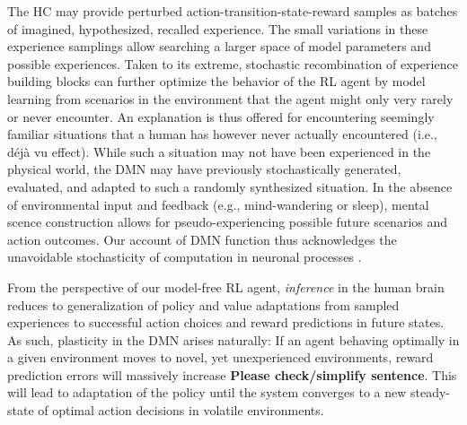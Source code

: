 \documentclass[10pt,letterpaper]{article}
\begin{document}
The HC may provide perturbed action-transition-state-reward samples
  as batches of imagined, hypothesized, recalled experience.
  The small variations in these experience samplings allow searching
  a larger space of model parameters and possible experiences.
  Taken to its extreme, stochastic recombination of experience
  building blocks can further optimize the behavior of the RL agent
  by model learning from scenarios in the environment that the agent might
  only very rarely or never encounter.
  An explanation is thus offered for encountering seemingly familiar situations that
  a human has however never actually encountered (i.e., d\'{e}j\`{a} vu effect).
  While such a situation may not have been experienced in the physical world,
  the DMN may have previously stochastically generated, evaluated, and adapted to
  such a randomly synthesized situation.
  In the absence of environmental input and feedback
  (e.g., mind-wandering or sleep),
  mental scence construction allows for pseudo-experiencing possible
  future scenarios and action outcomes.
  Our account of DMN function thus acknowledges the unavoidable stochasticity of
  computation in neuronal processes \citep{faisal2008noise}.


  From the perspective of our model-free RL agent,
  \textit{inference} in the human brain reduces to
  generalization of
  policy and value adaptations from sampled experiences to
  successful action choices and reward predictions in future states.
  As such,
  plasticity in the DMN arises naturally:
  If an agent behaving optimally in a given environment moves
  to novel, yet unexperienced environments, reward prediction errors will
  massively increase \textbf{Please check/simplify sentence}.
  This will lead to adaptation of the policy until the system converges to a
  new steady-state of optimal action decisions in volatile environments.

\end{document}
